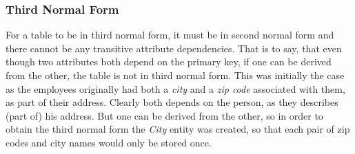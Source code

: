 \subsubsection{Third Normal Form}
For a table to be in third normal form, it must be in second normal form and 
there cannot be any transitive attribute dependencies. That is to say, that even 
though two attributes both depend on the primary key, if one can be derived 
from the other, the table is not in third normal form. This was initially the 
case as the employees originally had both a \emph{city} and a \emph{zip code} 
associated with them, as part of their address. Clearly both depends on the 
person, as they describes (part of) his address. But one can be derived from 
the other, so in order to obtain the third normal form the \emph{City} entity 
was created, so that each pair of zip codes and city names would only be stored 
once.

